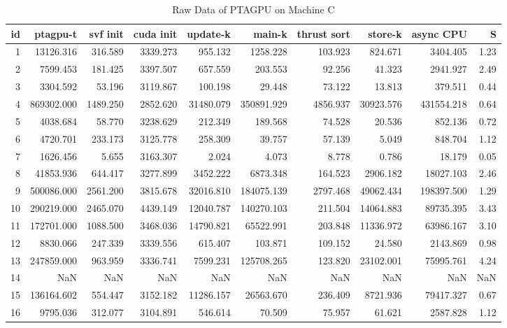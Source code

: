 \begin{table}[ht]
    \tiny
    \begin{tabular}{rrrrrrrrrr}
        \toprule
        id & ptagpu-t   & svf init & cuda init & update-k  & main-k     & thrust sort & store-k   & async CPU  & S    \\
        \midrule
        1  & 13126.316  & 316.589  & 3339.273  & 955.132   & 1258.228   & 103.923     & 824.671   & 3404.405   & 1.23 \\
        2  & 7599.453   & 181.425  & 3397.507  & 657.559   & 203.553    & 92.256      & 41.323    & 2941.927   & 2.49 \\
        3  & 3304.592   & 53.196   & 3119.867  & 100.198   & 29.448     & 73.122      & 13.813    & 379.511    & 0.44 \\
        4  & 869302.000 & 1489.250 & 2852.620  & 31480.079 & 350891.929 & 4856.937    & 30923.576 & 431554.218 & 0.64 \\
        5  & 4038.684   & 58.770   & 3238.629  & 212.349   & 189.568    & 74.528      & 20.536    & 852.136    & 0.72 \\
        6  & 4720.701   & 233.173  & 3125.778  & 258.309   & 39.757     & 57.139      & 5.049     & 848.704    & 1.12 \\
        7  & 1626.456   & 5.655    & 3163.307  & 2.024     & 4.073      & 8.778       & 0.786     & 18.179     & 0.05 \\
        8  & 41853.936  & 644.417  & 3277.899  & 3452.222  & 6873.348   & 164.523     & 2906.182  & 18027.103  & 2.46 \\
        9  & 500086.000 & 2561.200 & 3815.678  & 32016.810 & 184075.139 & 2797.468    & 49062.434 & 198397.500 & 1.29 \\
        10 & 290219.000 & 2465.070 & 4439.149  & 12040.787 & 140270.103 & 211.504     & 14064.883 & 89735.395  & 3.43 \\
        11 & 172701.000 & 1088.500 & 3468.036  & 14790.821 & 65522.991  & 203.848     & 11336.972 & 63986.167  & 3.10 \\
        12 & 8830.066   & 247.339  & 3339.556  & 615.407   & 103.871    & 109.152     & 24.580    & 2143.869   & 0.98 \\
        13 & 247859.000 & 963.959  & 3336.741  & 7599.231  & 125708.265 & 123.820     & 23102.001 & 75995.761  & 4.24 \\
        14 & NaN        & NaN      & NaN       & NaN       & NaN        & NaN         & NaN       & NaN        & NaN  \\
        15 & 136164.602 & 554.447  & 3152.182  & 11286.157 & 26563.670  & 236.409     & 8721.936  & 79417.327  & 0.67 \\
        16 & 9795.036   & 312.077  & 3104.891  & 546.614   & 70.509     & 75.957      & 61.621    & 2587.828   & 1.12 \\
        \bottomrule
    \end{tabular}
    \caption{Raw Data of PTAGPU on Machine C}
\end{table}
\normalsize

